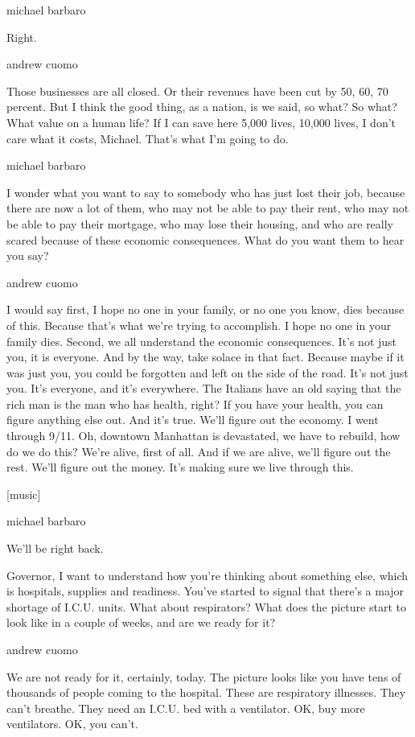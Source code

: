 michael barbaro

Right.

andrew cuomo

Those businesses are all closed. Or their revenues have been cut by 50,
60, 70 percent. But I think the good thing, as a nation, is we said, so
what? So what? What value on a human life? If I can save here 5,000
lives, 10,000 lives, I don't care what it costs, Michael. That's what
I'm going to do.

michael barbaro

I wonder what you want to say to somebody who has just lost their job,
because there are now a lot of them, who may not be able to pay their
rent, who may not be able to pay their mortgage, who may lose their
housing, and who are really scared because of these economic
consequences. What do you want them to hear you say?

andrew cuomo

I would say first, I hope no one in your family, or no one you know,
dies because of this. Because that's what we're trying to accomplish. I
hope no one in your family dies. Second, we all understand the economic
consequences. It's not just you, it is everyone. And by the way, take
solace in that fact. Because maybe if it was just you, you could be
forgotten and left on the side of the road. It's not just you. It's
everyone, and it's everywhere. The Italians have an old saying that the
rich man is the man who has health, right? If you have your health, you
can figure anything else out. And it's true. We'll figure out the
economy. I went through 9/11. Oh, downtown Manhattan is devastated, we
have to rebuild, how do we do this? We're alive, first of all. And if we
are alive, we'll figure out the rest. We'll figure out the money. It's
making sure we live through this.

{[}music{]}

michael barbaro

We'll be right back.

Governor, I want to understand how you're thinking about something else,
which is hospitals, supplies and readiness. You've started to signal
that there's a major shortage of I.C.U. units. What about respirators?
What does the picture start to look like in a couple of weeks, and are
we ready for it?

andrew cuomo

We are not ready for it, certainly, today. The picture looks like you
have tens of thousands of people coming to the hospital. These are
respiratory illnesses. They can't breathe. They need an I.C.U. bed with
a ventilator. OK, buy more ventilators. OK, you can't.

